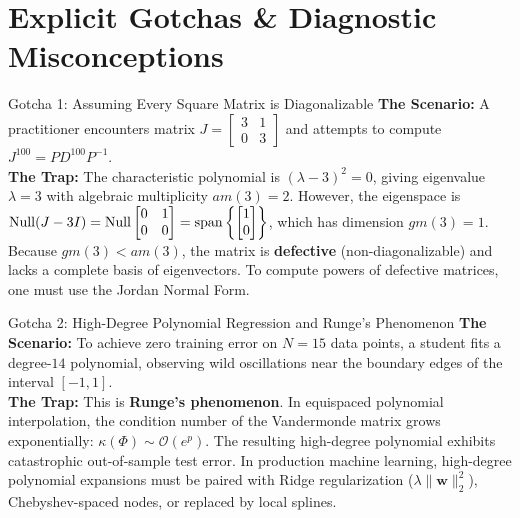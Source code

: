 \section{Explicit Gotchas \& Diagnostic Misconceptions}

\begin{trapbox}{Gotcha 1: Assuming Every Square Matrix is Diagonalizable}
\textbf{The Scenario:} A practitioner encounters matrix $J = \begin{bmatrix} 3 & 1 \\ 0 & 3 \end{bmatrix}$ and attempts to compute $J^{100} = P D^{100} P^{-1}$. \\
\textbf{The Trap:} The characteristic polynomial is $(\lambda - 3)^2 = 0$, giving eigenvalue $\lambda = 3$ with algebraic multiplicity $am(3) = 2$. However, the eigenspace is $\operatorname{Null}(J - 3I) = \operatorname{Null}\begin{bmatrix} 0 & 1 \\ 0 & 0 \end{bmatrix} = \operatorname{span}\left\{\begin{bmatrix} 1 \\ 0 \end{bmatrix}\right\}$, which has dimension $gm(3) = 1$. Because $gm(3) < am(3)$, the matrix is \textbf{defective} (non-diagonalizable) and lacks a complete basis of eigenvectors. To compute powers of defective matrices, one must use the Jordan Normal Form.
\end{trapbox}

\begin{trapbox}{Gotcha 2: High-Degree Polynomial Regression and Runge's Phenomenon}
\textbf{The Scenario:} To achieve zero training error on $N = 15$ data points, a student fits a degree-$14$ polynomial, observing wild oscillations near the boundary edges of the interval $[-1, 1]$. \\
\textbf{The Trap:} This is \textbf{Runge's phenomenon}. In equispaced polynomial interpolation, the condition number of the Vandermonde matrix grows exponentially: $\kappa(\Phi) \sim \mathcal{O}(e^p)$. The resulting high-degree polynomial exhibits catastrophic out-of-sample test error. In production machine learning, high-degree polynomial expansions must be paired with Ridge regularization ($\lambda \|\mathbf{w}\|_2^2$), Chebyshev-spaced nodes, or replaced by local splines.
\end{trapbox}

